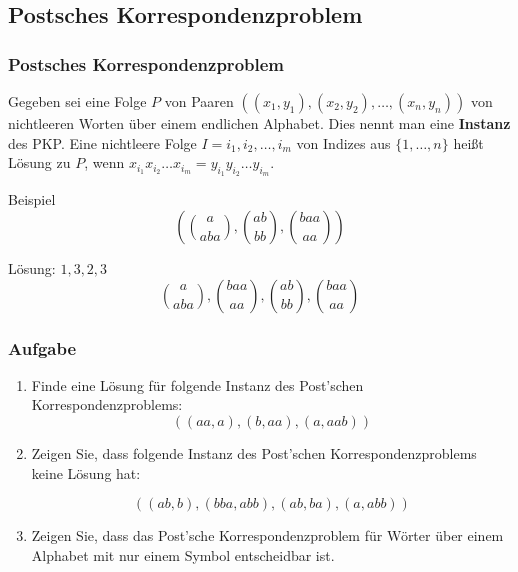 \subsection{Postsches Korrespondenzproblem}
\begin{frame}
\frametitle{Postsches Korrespondenzproblem}
Gegeben sei eine Folge $P$ von Paaren $((x_1, y_1), (x_2, y_2), \ldots, (x_n,y_n))$ von nichtleeren Worten über einem endlichen Alphabet. Dies nennt man eine \textbf{Instanz} des PKP.
Eine nichtleere Folge $I = i_1, i_2, \ldots, i_m$ von Indizes aus $\{1, \ldots, n\}$ heißt Lösung zu $P$, wenn $x_{i_1}x_{i_2}\ldots{}x_{i_m} = y_{i_1}y_{i_2}\ldots{}y_{i_m}$.
\begin{block}{Beispiel}
\begin{displaymath}
( {a \choose aba}, {ab \choose bb}, {baa \choose aa} )
\end{displaymath}

Lösung: $1,3,2,3$
\begin{displaymath}
{a \choose aba}, {baa \choose aa}, {ab \choose bb}, {baa \choose aa}
\end{displaymath}

\end{block}
\end{frame}

\begin{frame}
\frametitle{Aufgabe}
\begin{enumerate}
\item Finde eine Lösung für folgende Instanz des Post'schen Korrespondenzproblems: 
\[ ((aa, a), (b, aa), (a, aab)) \]
  \item Zeigen Sie, dass folgende Instanz des Post'schen Korrespondenzproblems
        keine Lösung hat:

        \[ ((ab, b), (bba, abb), (ab, ba), (a, abb)) \]

  \item Zeigen Sie, dass das Post'sche Korrespondenzproblem für Wörter
über einem Alphabet mit nur einem Symbol entscheidbar ist.
\end{enumerate}
\end{frame}

